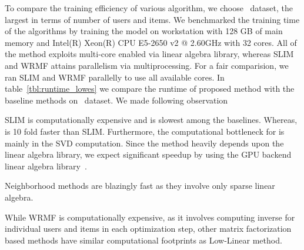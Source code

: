 
To compare the training efficiency of various algorithm, we choose \Lowes\ dataset, the largest in terms of number of users and items. 
We benchmarked the training time of the algorithms 
by training the model on  workstation with 128 GB of main memory and Intel(R) Xeon(R) CPU E5-2650 v2 @ 2.60GHz with 32 cores. All of the method exploits multi-core enabled via linear algebra library, whereas SLIM and WRMF attains parallelism via multiprocessing. For a fair comparision, we ran  SLIM and WRMF parallelly to use all available cores.  In table~\ref{tbl:runtime_lowes} we compare the runtime of proposed method with the baseline methods on \Lowes\ dataset. We  made following observation
\begin{compactitem}
\item  SLIM is computationally expensive and is slowest among the baselines. Whereas, \LinearLow is 10 fold faster than SLIM. Furthermore, the computational bottleneck for \LinearLow is mainly in the SVD computation. Since the method heavily depends upon the linear algebra library, we expect significant speedup by using the GPU backend linear algebra library~\citep{Voronin:GPURSVD}. 
\item Neighborhood methods are blazingly fast as they involve only sparse linear algebra.
\item While WRMF is computationally expensive, as it involves computing inverse for individual users and items in each optimization step, other matrix factorization based methods have similar computational footprints as Low-Linear method.
\end{compactitem}
\begin{table}[!htb]
\centering
{}
\caption{Training time on the  \Guitar\ Dataset.}
\label{tbl:runtime_lowes}
\end{table}